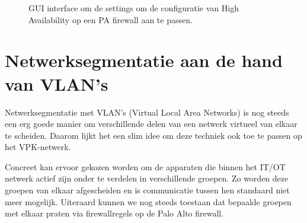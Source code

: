 \begin{figure}[H]
    \centering
    \caption[PA High Availability settings]{\label{fig:grail}GUI interface om de settings om de configuratie van High Availability op een PA firewall aan te passen.}
\end{figure}


\section{Netwerksegmentatie aan de hand van VLAN’s}

Netwerksegmentatie met VLAN’s (Virtual Local Area Networks) is nog steeds een erg goede manier om verschillende delen van een netwerk virtueel van elkaar te scheiden. Daarom lijkt het een slim idee om deze techniek ook toe te passen op het VPK-netwerk.

Concreet kan ervoor gekozen worden om de apparaten die binnen het IT/OT netwerk actief zijn onder te verdelen in verschillende groepen. Zo worden deze groepen van elkaar afgescheiden en is communicatie tussen hen standaard niet meer mogelijk. Uiteraard kunnen we nog steeds toestaan dat bepaalde groepen met elkaar praten via firewallregels op de Palo Alto firewall.

